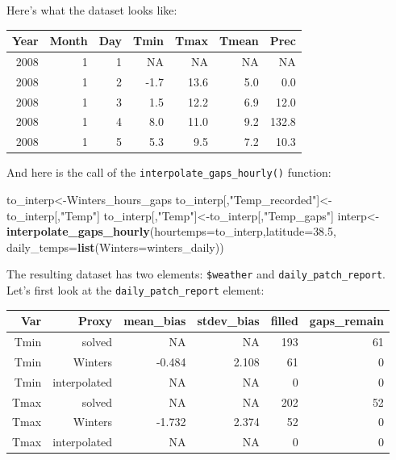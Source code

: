 \documentclass[
]{book}
\newenvironment{Shaded}{\begin{snugshade}}{\end{snugshade}}
\newcommand{\DataTypeTok}[1]{\textcolor[rgb]{0.13,0.29,0.53}{#1}}
\newcommand{\FloatTok}[1]{\textcolor[rgb]{0.00,0.00,0.81}{#1}}
\newcommand{\KeywordTok}[1]{\textcolor[rgb]{0.13,0.29,0.53}{\textbf{#1}}}
\newcommand{\NormalTok}[1]{#1}
\newcommand{\StringTok}[1]{\textcolor[rgb]{0.31,0.60,0.02}{#1}}
\begin{document}
Here's what the dataset looks like:

\begingroup\fontsize{10}{12}\selectfont

\begin{tabular}{r|r|r|r|r|r|r}
\hline
Year & Month & Day & Tmin & Tmax & Tmean & Prec\\
\hline
2008 & 1 & 1 & NA & NA & NA & NA\\
\hline
2008 & 1 & 2 & -1.7 & 13.6 & 5.0 & 0.0\\
\hline
2008 & 1 & 3 & 1.5 & 12.2 & 6.9 & 12.0\\
\hline
2008 & 1 & 4 & 8.0 & 11.0 & 9.2 & 132.8\\
\hline
2008 & 1 & 5 & 5.3 & 9.5 & 7.2 & 10.3\\
\hline
\end{tabular}
\endgroup{}

And here is the call of the \texttt{interpolate\_gaps\_hourly()} function:

\begin{Shaded}
\begin{Highlighting}[]
\NormalTok{to_interp<-Winters_hours_gaps}
\NormalTok{to_interp[,}\StringTok{"Temp_recorded"}\NormalTok{]<-to_interp[,}\StringTok{"Temp"}\NormalTok{]}
\NormalTok{to_interp[,}\StringTok{"Temp"}\NormalTok{]<-to_interp[,}\StringTok{"Temp_gaps"}\NormalTok{]}
\NormalTok{interp<-}\KeywordTok{interpolate_gaps_hourly}\NormalTok{(}\DataTypeTok{hourtemps=}\NormalTok{to_interp,}\DataTypeTok{latitude=}\FloatTok{38.5}\NormalTok{,}
                                \DataTypeTok{daily_temps=}\KeywordTok{list}\NormalTok{(}\DataTypeTok{Winters=}\NormalTok{winters_daily))}
\end{Highlighting}
\end{Shaded}

The resulting dataset has two elements: \texttt{\$weather} and \texttt{daily\_patch\_report}. Let's first look at the \texttt{daily\_patch\_report} element:

\begingroup\fontsize{10}{12}\selectfont

\begin{tabular}{r|r|r|r|r|r}
\hline
Var & Proxy & mean\_bias & stdev\_bias & filled & gaps\_remain\\
\hline
Tmin & solved & NA & NA & 193 & 61\\
\hline
Tmin & Winters & -0.484 & 2.108 & 61 & 0\\
\hline
Tmin & interpolated & NA & NA & 0 & 0\\
\hline
Tmax & solved & NA & NA & 202 & 52\\
\hline
Tmax & Winters & -1.732 & 2.374 & 52 & 0\\
\hline
Tmax & interpolated & NA & NA & 0 & 0\\
\hline
\end{tabular}
\endgroup{}
\end{document}
